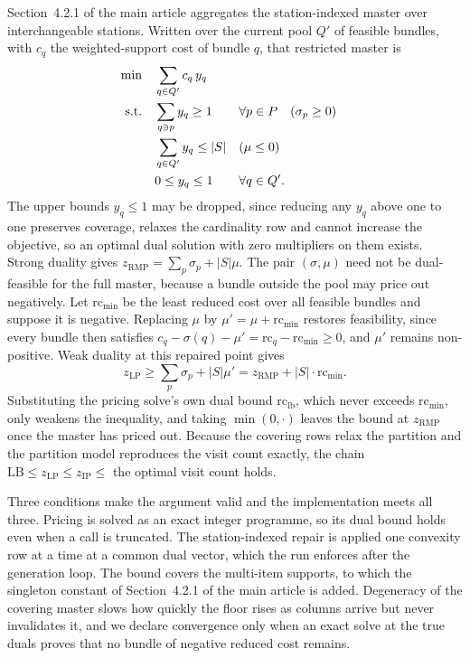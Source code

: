 \documentclass[11pt]{article}
\begin{document}
Section~4.2.1 of the main article aggregates the station-indexed master over interchangeable
stations. Written over the current pool $Q'$ of feasible bundles, with $c_q$ the weighted-support
cost of bundle $q$, that restricted master is
\begin{align}
\min \quad & \sum_{q \in Q'} c_q\, y_q \notag\\
\text{s.t.} \quad
& \sum_{q \ni p} y_q \ge 1 && \forall p \in P \quad (\sigma_p \ge 0) \label{sup:eq:cover}\\
& \sum_{q \in Q'} y_q \le |S| && (\mu \le 0) \label{sup:eq:card}\\
& 0 \le y_q \le 1 && \forall q \in Q'. \notag
\end{align}
The upper bounds $y_q\le 1$ may be dropped, since reducing any $y_q$ above one to one preserves
coverage, relaxes the cardinality row and cannot increase the objective, so an optimal dual
solution with zero multipliers on them exists. Strong duality gives
$z_{\mathrm{RMP}}=\sum_p\sigma_p+|S|\mu$. The pair $(\sigma,\mu)$ need not be dual-feasible for the
full master, because a bundle outside the pool may price out negatively. Let $\mathrm{rc}_{\min}$
be the least reduced cost over all feasible bundles and suppose it is negative. Replacing $\mu$ by
$\mu'=\mu+\mathrm{rc}_{\min}$ restores feasibility, since every bundle then satisfies
$c_q-\sigma(q)-\mu'=\mathrm{rc}_q-\mathrm{rc}_{\min}\ge 0$, and $\mu'$ remains non-positive. Weak
duality at this repaired point gives
\begin{equation*}
z_{\mathrm{LP}}\ge\sum_p\sigma_p+|S|\mu'=z_{\mathrm{RMP}}+|S|\cdot\mathrm{rc}_{\min}.
\end{equation*}
Substituting the pricing solve's own dual bound $\mathrm{rc}_{\mathrm{lb}}$, which never exceeds
$\mathrm{rc}_{\min}$, only weakens the inequality, and taking $\min(0,\cdot)$ leaves the bound at
$z_{\mathrm{RMP}}$ once the master has priced out. Because the covering rows relax the partition
and the partition model reproduces the visit count exactly, the chain
$\mathrm{LB}\le z_{\mathrm{LP}}\le z_{\mathrm{IP}}\le$ the optimal visit count holds.

Three conditions make the argument valid and the implementation meets all three. Pricing is solved
as an exact integer programme, so its dual bound holds even when a call is truncated. The
station-indexed repair is applied one convexity row at a time at a common dual vector, which the
run enforces after the generation loop. The bound covers the multi-item supports, to which the
singleton constant of Section~4.2.1 of the main article is added. Degeneracy of the covering master
slows how quickly the floor rises as columns arrive but never invalidates it, and we declare
convergence only when an exact solve at the true duals proves that no bundle of negative reduced
cost remains.
\end{document}
